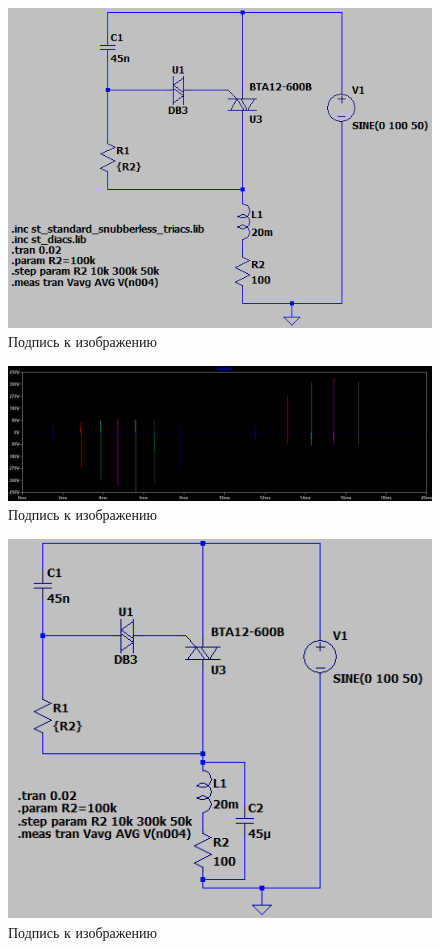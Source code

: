 \documentclass[a4paper, 12pt]{article}
\begin{document}
    \begin{figure}[H]
        \centering
        \includegraphics[scale=0.5]{scheme5.png}
        \captionsetup{skip=0pt}
        \caption{Подпись к изображению}
        \label{fig:scheme5}
    \end{figure}


    \begin{figure}[H]
        \centering
        \includegraphics[scale=0.45]{R2_L20m.png}
        \captionsetup{skip=0pt}
        \caption{Подпись к изображению}
        \label{fig:R2_L20m}
    \end{figure}


    \begin{figure}[H]
        \centering
        \includegraphics[scale=0.5]{scheme6.png}
        \captionsetup{skip=0pt}
        \caption{Подпись к изображению}
        \label{fig:scheme6}
    \end{figure}
\end{document}

